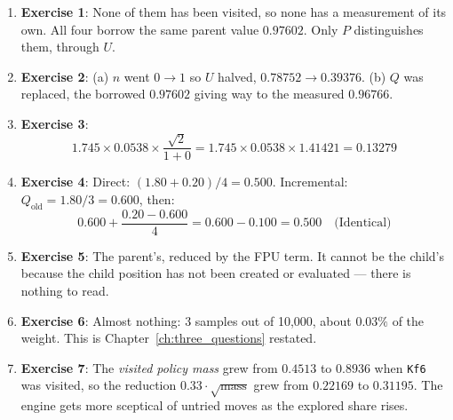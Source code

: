 \begin{enumerate}[leftmargin=2em]
  \item \textbf{Exercise 1}: None of them has been visited, so none has a measurement of its own. All four borrow the same parent value $0.97602$. Only $P$ distinguishes them, through $U$.
  \item \textbf{Exercise 2}: (a) $n$ went $0 \to 1$ so $U$ halved, $0.78752 \to 0.39376$. (b) $Q$ was replaced, the borrowed $0.97602$ giving way to the measured $0.96766$.
  \item \textbf{Exercise 3}: 
  \begin{equation*}
    1.745 \times 0.0538 \times \frac{\sqrt{2}}{1+0} = 1.745 \times 0.0538 \times 1.41421 = \mathbf{0.13279}
  \end{equation*}
  \item \textbf{Exercise 4}: Direct: $(1.80 + 0.20)/4 = \mathbf{0.500}$. Incremental: $Q_{\text{old}} = 1.80/3 = 0.600$, then:
  \begin{equation*}
    0.600 + \frac{0.20 - 0.600}{4} = 0.600 - 0.100 = \mathbf{0.500} \quad \text{(Identical)}
  \end{equation*}
  \item \textbf{Exercise 5}: The parent's, reduced by the FPU term. It cannot be the child's because the child position has not been created or evaluated --- there is nothing to read.
  \item \textbf{Exercise 6}: Almost nothing: 3 samples out of 10,000, about $0.03\%$ of the weight. This is Chapter~\ref{ch:three_questions} restated.
  \item \textbf{Exercise 7}: The \textit{visited policy mass} grew from $0.4513$ to $0.8936$ when \texttt{Kf6} was visited, so the reduction $0.33 \cdot \sqrt{\text{mass}}$ grew from $0.22169$ to $0.31195$. The engine gets more sceptical of untried moves as the explored share rises.
\end{enumerate}
